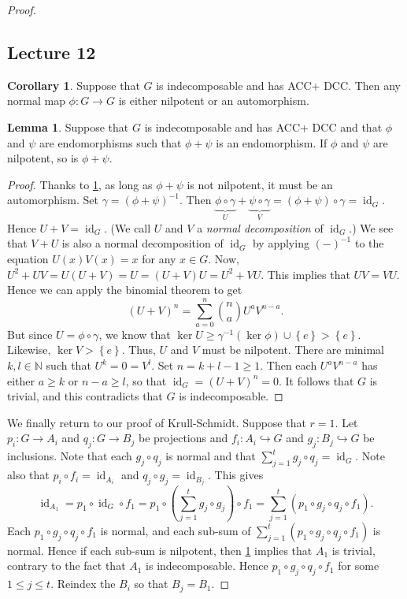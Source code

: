 \documentclass[10pt,letterpaper,cm]{nupset}
\theoremstyle{definition}
\theoremstyle{theorem}
\newtheorem{lemma}[definition]{Lemma}
\newtheorem{corollary}[definition]{Corollary}
\theoremstyle{remark}
\newcommand{\N}{\mathbb N}
\newcommand{\1}{\mathbf{1}}
\newcommand{\0}{\vec 0}
\newcommand{\dcc}{\textsf{DCC}\xspace}
\newcommand{\acc}{\textsf{ACC}\xspace}
\DeclareMathOperator{\id}{\mathrm{id}}
\begin{document}
\begin{proof}
\subsection{Lecture 12}

\begin{corollary}\label{pc1}
Suppose that $G$ is indecomposable and has \acc + \dcc. Then any normal map $\phi : G \to G$ is either nilpotent or an automorphism.
\end{corollary}

\begin{lemma}\label{PL1}
Suppose that $G$ is indecomposable and has \acc + \dcc and that $\phi$ and $\psi$ are endomorphisms such that $\phi + \psi$ is an endomorphism. If $\phi$ and $\psi$ are nilpotent, so is $\phi + \psi$.
\end{lemma}

\begin{proof}
Thanks to \cref{pc1}, as long as $\phi + \psi$ is not nilpotent, it must be an automorphism. Set $\gamma = \left(\phi + \psi\right)^{-1}$. Then $\underbrace{\phi \circ \gamma}_U + \underbrace{\psi \circ \gamma}_V = \left(\phi +\psi\right) \circ \gamma = \id_G$. Hence $U + V = \id_G$. (We call $U$ and $V$ a \textit{normal decomposition} of $\id_G$.) We see that $V + U$ is also a normal decomposition of $\id_G$ by applying $\left({-}\right)^{-1}$ to the equation $U(x)V(x) =x$ for any $x \in G$.
Now, $U^2 + UV = U(U + V) = U = \left(U + V\right)U = U^2 + VU$. This implies that $UV = VU$. Hence we can apply the binomial theorem to get $$\left(U + V\right)^n = \sum_{a=0}^n{ {n}\choose {a}} U^aV^{n-a}.$$ But since $U = \phi \circ \gamma$, we know that $\ker{U}\geq \gamma^{-1}(\ker{\phi}) \cup \left\{e\right\} > \left\{e\right\}$. Likewise, $\ker{V} > \left\{e\right\}$. Thus, $U$ and $V$ must be nilpotent. There are minimal $k, l \in \N$ such that $U^k = 0 = V^l$. Set $n = k+l -1 \geq 1$. Then each $U^aV^{n-a}$ has either $a\geq k$ or $n-a\geq l$, so that $\id_G = \left(U+V\right)^n = 0$. It follows that $G$ is trivial, and this contradicts that $G$ is indecomposable.
\end{proof}

We finally return to our proof of Krull-Schmidt. Suppose that $r=1$. Let $p_i : G \to A_i$ and $q_j : G \to B_j$ be projections and $f_i : A_i \hookrightarrow G$ and $g_j : B_j \hookrightarrow G$ be inclusions. Note that each $g_j \circ q_j$ is normal and that $\sum_{j=1}^t g_j \circ q_j = \id_G$. Note also that $p_i \circ f_i = \id_{A_i}$ and $q_j \circ g_j = \id_{B_j}$. This gives $$\id_{A_1} = p_1 \circ \id_G \circ f_1 = p_1 \circ \left(\sum_{j=1}^t g_j \circ g_j\right) \circ f_1 = \sum_{j=1}^t (p_1 \circ g_j \circ q_j \circ f_1).$$ Each $p_1 \circ g_j \circ q_j \circ f_1$ is normal, and each sub-sum of $\sum_{j=1}^t (p_1 \circ g_j \circ q_j \circ f_1)$ is normal. Hence if each sub-sum is nilpotent, then \cref{PL1} implies that $A_1$ is trivial, contrary to the fact that $A_1$ is indecomposable. Hence $ p_1 \circ g_j \circ q_j \circ f_1$ for some $1\leq j \leq t$. Reindex the $B_i$ so that $B_j = B_1$. 


\end{proof}
\end{document}
